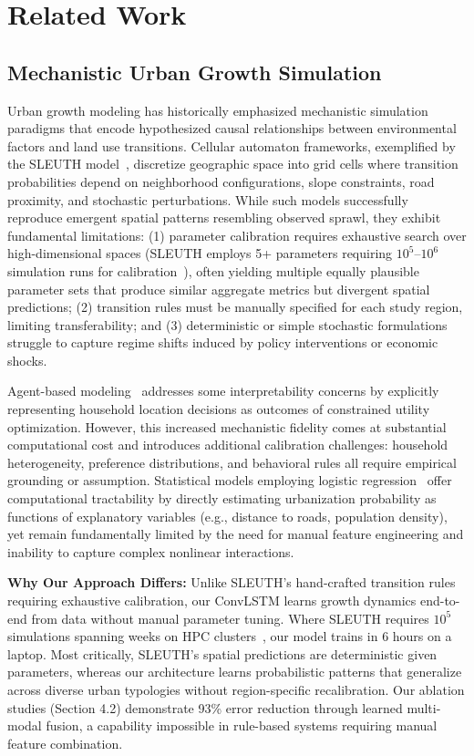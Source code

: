 \documentclass[conference]{IEEEtran}
\begin{document}
\section{Related Work}

\subsection{Mechanistic Urban Growth Simulation}
Urban growth modeling has historically emphasized mechanistic simulation paradigms that encode hypothesized causal relationships between environmental factors and land use transitions. Cellular automaton frameworks, exemplified by the SLEUTH model~\cite{clarke1997}, discretize geographic space into grid cells where transition probabilities depend on neighborhood configurations, slope constraints, road proximity, and stochastic perturbations. While such models successfully reproduce emergent spatial patterns resembling observed sprawl, they exhibit fundamental limitations: (1) parameter calibration requires exhaustive search over high-dimensional spaces (SLEUTH employs 5+ parameters requiring $10^5$--$10^6$ simulation runs for calibration~\cite{silva2002}), often yielding multiple equally plausible parameter sets that produce similar aggregate metrics but divergent spatial predictions; (2) transition rules must be manually specified for each study region, limiting transferability; and (3) deterministic or simple stochastic formulations struggle to capture regime shifts induced by policy interventions or economic shocks.

Agent-based modeling~\cite{silva2002} addresses some interpretability concerns by explicitly representing household location decisions as outcomes of constrained utility optimization. However, this increased mechanistic fidelity comes at substantial computational cost and introduces additional calibration challenges: household heterogeneity, preference distributions, and behavioral rules all require empirical grounding or assumption. Statistical models employing logistic regression~\cite{alkheder2008} offer computational tractability by directly estimating urbanization probability as functions of explanatory variables (e.g., distance to roads, population density), yet remain fundamentally limited by the need for manual feature engineering and inability to capture complex nonlinear interactions.

\textbf{Why Our Approach Differs:} Unlike SLEUTH's hand-crafted transition rules requiring exhaustive calibration, our ConvLSTM learns growth dynamics end-to-end from data without manual parameter tuning. Where SLEUTH requires $10^5$ simulations spanning weeks on HPC clusters~\cite{silva2002}, our model trains in 6 hours on a laptop. Most critically, SLEUTH's spatial predictions are deterministic given parameters, whereas our architecture learns probabilistic patterns that generalize across diverse urban typologies without region-specific recalibration. Our ablation studies (Section 4.2) demonstrate 93\% error reduction through learned multi-modal fusion, a capability impossible in rule-based systems requiring manual feature combination.
\end{document}

